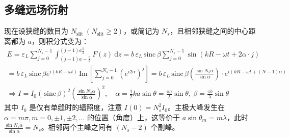 \documentclass[UTF8]{report}
\def\Im{\mathrm{\,Im}\,}
\def\sinc{\mathrm{\,sinc}\,}
\theoremstyle{MyLineTheoremStyle} %
\theoremstyle{MyBlockTheoremStyle} %
\theoremstyle{MySubsubsectionStyle} %
\begin{document}
\subsection{多缝远场衍射}

现在设狭缝的数目为 $N_{\text{slit}} \ (N_{\text{slit}} \geqslant 2)$，或简记为 $N_s$，且相邻狭缝之间的中心距离都为 $a$，则积分式变为：
\begin{gather}
E = \varepsilon_L \sum_{j=0}^{N_s-1} \int_{(j-1)a-\frac{b}{2}}^{(j-1)a\frac{b}{2}} F(z) \ \mathrm{d}z = b \,\varepsilon_L  \sinc \beta \sum_{j=0}^{N_s-1}\sin (kR - \omega t + 2\alpha \cdot j) \\ 
= b \,\varepsilon_L  \sinc \beta e^{i(kR - \omega t)}  \Im \left[ \sum_{j=0}^{N_s-1} \left(e^{i2\alpha}\right)^j \right]
=  b \,\varepsilon_L  \sinc \beta \left(\frac{\sin N_s \alpha}{\sin \alpha}\right) \cdot e^{i\left(kR - \omega t + (N-1)\alpha\right)} \\ 
\Longrightarrow I = I_0 \left( \sinc \beta\right)^2 \left(\frac{\sin N_s \alpha}{\sin \alpha}\right)^2
,\quad \alpha = \frac{1}{2}k a \sin \theta = \frac{\pi a}{\lambda} \sin \theta,\ \beta = \frac{\pi b}{\lambda} \sin \theta
\end{gather}
其中 $I_0$ 是仅有单缝时的辐照度，注意 $I(0) = N_s^2I_0$。主极大峰发生在 $\alpha = m\pi, m = 0, \pm 1, \pm 2, ...$ 的位置（角度）上，这等价于 $a \sin \theta_m = m \lambda$，此时 $\frac{\sin N_s \alpha}{\sin \alpha} = N_s$。相邻两个主峰之间有 $(N_s - 2)$ 个副峰。
\end{document}

